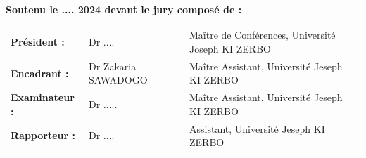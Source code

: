 \documentclass[12pt]{report}
\begin{document}
\begin{titlepage}
\begin{center} 
\textbf{Soutenu le .... 2024 devant le jury composé de :}
\end{center}
\vspace*{0.3cm}

\begin{tabular}{p{} p{} p{}} 

\textbf{Président :} & Dr .... & Maître de Conférences, Université Joseph KI ZERBO\\
\textbf{Encadrant :} & Dr Zakaria SAWADOGO & Maître Assistant, Université Jeseph KI ZERBO\\
\textbf{Examinateur :} & Dr ..... & Maître Assistant, Université Jeseph KI ZERBO\\
\textbf{Rapporteur :} & Dr .... & Assistant, Université Jeseph KI ZERBO\\
\end{tabular}
\\

\end{titlepage}


\end{document}
